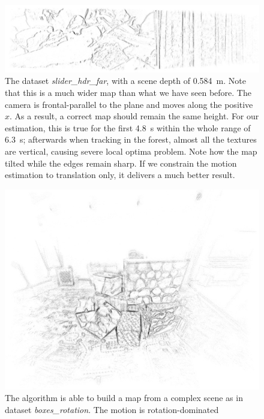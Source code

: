   \begin{figure}
    \centering
    \includegraphics[width=\textwidth]{images/slider_hdr_far_map_45.jpg}
    \caption{The dataset \textit{slider\_hdr\_far}, with a scene depth
      of \SI{0.584}{\meter}. Note that this is a much wider map than
      what we have seen before. The camera is frontal-parallel to the
      plane and moves along the positive $x$. As a result, a correct
      map should remain the same height. For our estimation, this is
      true for the first \SI{4.8}{\second} within the whole range of
      \SI{6.3}{\second}; afterwards when tracking in the forest,
      almost all the textures are vertical, causing severe local
      optima problem. Note how the map tilted while the edges remain
      sharp. If we constrain the motion estimation to translation
      only, it delivers a much better result.}
    \label{fig:slider_hdr_far_map}
  \end{figure}
  \begin{figure}
    \centering
    \includegraphics[width=\textwidth]{images/boxes_rotation_map.jpg}
    \caption{The algorithm is able to build a map from a complex scene
      as in dataset \textit{boxes\_rotation}. The motion is
      rotation-dominated}
    \label{fig:boxes_rotation_map}
  \end{figure}


